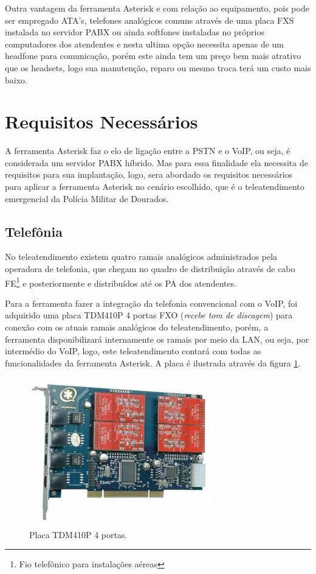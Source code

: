 Outra vantagem da ferramenta Asterisk e com relação ao equipamento, pois pode ser empregado ATA's, telefones analógicos comuns através de uma placa FXS instalada no servidor PABX ou ainda softfones instaladas no próprios computadores dos atendentes e nesta ultima opção necessita apenas de um headfone para comunicação, porém este ainda tem um preço bem mais atrativo que os headsets, logo sua manutenção, reparo ou mesmo troca terá um custo mais baixo.

\section{Requisitos Necessários}
A ferramenta Asterisk faz o elo de ligação entre a PSTN e o VoIP, ou seja, é considerada um servidor PABX híbrido. Mas para essa finalidade ela necessita de requisitos para sua implantação, logo, sera abordado os requisitos necessários para aplicar a ferramenta Asterisk no cenário escolhido, que é o teleatendimento emergencial da Polícia Militar de Dourados.

\subsection{Telefônia}
No teleatendimento existem quatro ramais analógicos administrados pela operadora de telefonia, que chegam no quadro de distribuição através de cabo FE\footnote{Fio telefônico para instalações aéreas} e posteriormente e distribuídos até os PA dos atendentes.

Para a ferramenta fazer a integração da telefonia convencional com o VoIP, foi adquirido uma placa TDM410P 4 portas FXO (\textit{recebe tom de discagem}) para conexão com os atuais ramais analógicos do teleatendimento, porém, a ferramenta disponibilizará internamente os ramais por meio da LAN, ou seja, por intermédio do VoIP, logo, este teleatendimento contará com todas as funcionalidades da ferramenta Asterisk. A placa é ilustrada através da figura \ref{Figura16}.

\begin{figure}[h]
	\centering
	\includegraphics[width=8cm]{imagens/tdm410p.jpg}
	\caption{Placa TDM410P 4 portas.}
    \label{Figura16}
\end{figure}

